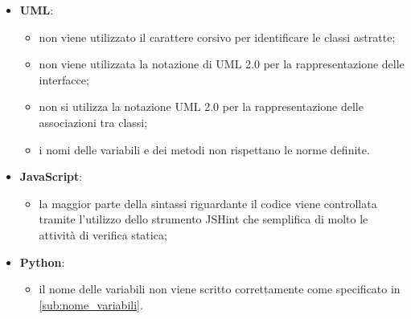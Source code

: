 \begin{itemize}
		\item \textbf{UML}:
			\begin{itemize}
				\item non viene utilizzato il carattere corsivo per identificare le classi astratte;
				\item non viene utilizzata la notazione di UML 2.0 per la rappresentazione delle interfacce;
				\item non si utilizza la notazione UML 2.0 per la rappresentazione delle associazioni tra classi;
				\item i nomi delle variabili e dei metodi non rispettano le norme definite.
			\end{itemize}
		\item \textbf{JavaScript}:
			\begin{itemize}
				\item la maggior parte della sintassi riguardante il codice viene controllata tramite l'utilizzo dello strumento JSHint che semplifica di molto le attività di verifica statica;
			\end{itemize}
		\item \textbf{Python}:
			\begin{itemize}
				\item il nome delle variabili non viene scritto correttamente come specificato in \ref{sub:nome_variabili}.
			\end{itemize}
	\end{itemize}
